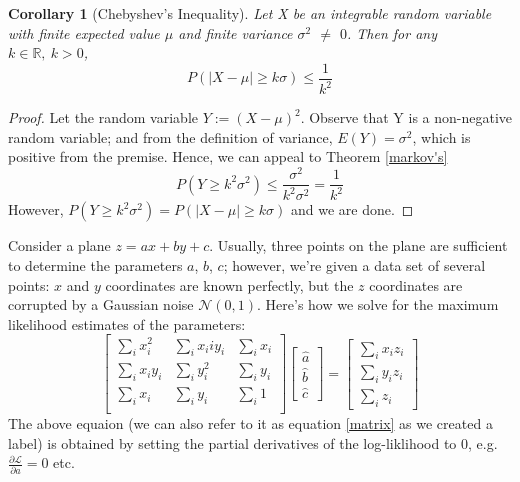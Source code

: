 \documentclass[10pt, Computer Modern]{article}
\newtheorem{corollary}{Corollary}
\begin{document}
\begin{corollary}[Chebyshev's Inequality]
\label{chebyshev's}
Let X be an integrable random variable with finite expected value $\mu$ and finite variance $\sigma^2$ $\ne$ $0$. Then for any $k \in \mathbb{R},~ k > 0$,  
\begin{equation*}
P(|X - \mu| \geq k\sigma) \leq \frac{1}{k^2}
\end{equation*}

\end{corollary}
\begin{proof}
Let the random variable $Y := (X - \mu)^2$. Observe that Y is a non-negative random variable; and from the definition of variance, $E(Y) = \sigma^2$, which is positive from the premise. Hence, we can appeal to Theorem \ref{markov's}
\begin{equation*}
P(Y \geq k^2\sigma^2) \leq \frac{\sigma^2}{k^2\sigma^2} = \frac{1}{k^2}
\end{equation*}
However, $P(Y \geq k^2\sigma^2) = P(|X - \mu| \geq k\sigma)$ and we are done.
\end{proof} 
Consider a plane $z = ax + by +c$. Usually, three points on the plane are sufficient to determine the parameters  $a$, $b$, $c$; however, we're given a data set of several points: $x$ and $y$ coordinates are known perfectly, but the $z$ coordinates are corrupted by a Gaussian noise $\mathcal{N}(0,1)$. Here's how we solve for the maximum likelihood estimates of the parameters:
\begin{equation}\label{matrix}
\begin{bmatrix}
		\sum_{i}x_{i}^2	 &  \sum_{i}x_{i}{i}y_{i}   &  \sum_{i}x_{i} \\
		\sum_{i}x_{i}y_{i}	 &  \sum_{i}y_{i}^2   &  \sum_{i}y_{i}  \\
		\sum_{i}x_{i}	&   \sum_{i}y_{i}   &  \sum_{i}1   \\ 
\end{bmatrix}
\begin{bmatrix}
	\hat{a}  \\  \hat{b}  \\ \hat{c}
\end{bmatrix} = 
\begin{bmatrix}
	\sum_{i}x_{i}z_{i}  \\ \sum_{i}y_{i}z_{i}	\\ \sum_{i}z_{i}
\end{bmatrix}
\end{equation}
The above equaion (we can also refer to it as equation \ref{matrix} as we created a label) is obtained by setting the partial derivatives of the log-liklihood to 0, e.g. $\frac{\partial \mathcal{L}}{\partial a} = 0$ etc.
\end{document}
